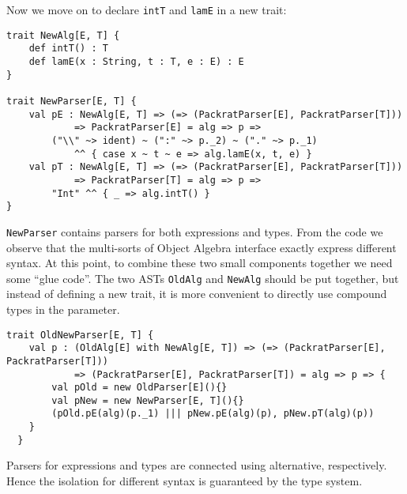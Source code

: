 Now we move on to declare \lstinline{intT} and \lstinline{lamE} in a new trait:
\begin{lstlisting}
trait NewAlg[E, T] {
    def intT() : T
    def lamE(x : String, t : T, e : E) : E
}

trait NewParser[E, T] {
    val pE : NewAlg[E, T] => (=> (PackratParser[E], PackratParser[T]))
            => PackratParser[E] = alg => p =>
        ("\\" ~> ident) ~ (":" ~> p._2) ~ ("." ~> p._1)
            ^^ { case x ~ t ~ e => alg.lamE(x, t, e) }
    val pT : NewAlg[E, T] => (=> (PackratParser[E], PackratParser[T]))
            => PackratParser[T] = alg => p =>
        "Int" ^^ { _ => alg.intT() }
}
\end{lstlisting}
\lstinline{NewParser} contains parsers for both expressions and types. From the code we observe that the multi-sorts of Object Algebra interface
exactly express different syntax. At this point, to combine these two small components together we need some ``glue code''. The two ASTs \lstinline{OldAlg} and
\lstinline{NewAlg} should be put together, but instead of defining a new trait, it is more convenient to directly use compound types in the parameter.
\begin{lstlisting}
trait OldNewParser[E, T] {
    val p : (OldAlg[E] with NewAlg[E, T]) => (=> (PackratParser[E], PackratParser[T]))
            => (PackratParser[E], PackratParser[T]) = alg => p => {
        val pOld = new OldParser[E](){}
        val pNew = new NewParser[E, T](){}
        (pOld.pE(alg)(p._1) ||| pNew.pE(alg)(p), pNew.pT(alg)(p))
    }
  }
\end{lstlisting}
Parsers for expressions and types are connected using alternative, respectively. Hence the isolation for different syntax
is guaranteed by the type system.
